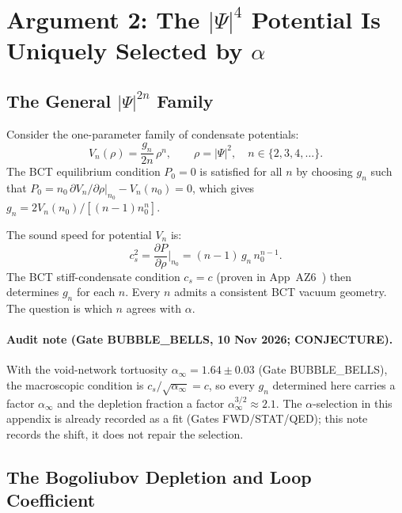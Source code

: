 \documentclass[11pt,a4paper]{article}
\theoremstyle{bctthm}
\theoremstyle{definition}
\begin{document}
\section{Argument 2: The $|\Psi|^4$ Potential Is Uniquely Selected by $\alpha$}

\subsection{The General $|\Psi|^{2n}$ Family}

Consider the one-parameter family of condensate potentials:
\begin{equation}
V_n(\rho) = \frac{g_n}{2n}\,\rho^n, \qquad \rho = |\Psi|^2,\quad n \in \{2,3,4,\ldots\}.
\label{eq:Vn}
\end{equation}
The BCT equilibrium condition $P_0 = 0$ is satisfied for all $n$
by choosing $g_n$ such that $P_0 = n_0\,\partial V_n/\partial\rho|_{n_0} - V_n(n_0) = 0$,
which gives $g_n = 2V_n(n_0)/[(n-1)n_0^n]$.

The sound speed for potential $V_n$ is:
\begin{equation}
c_s^2 = \frac{\partial P}{\partial\rho}\bigg|_{n_0}
= (n-1)\,g_n\,n_0^{n-1}.
\end{equation}
The BCT stiff-condensate condition $c_s = c$ (proven in App~AZ6~\cite{az6})
then determines $g_n$ for each $n$. Every $n$ admits a consistent
BCT vacuum geometry. The question is which $n$ agrees with $\alpha$.

\paragraph*{Audit note (Gate BUBBLE\_BELLS, 10 Nov 2026; CONJECTURE).} With the void-network tortuosity $\alpha_\infty=1.64\pm0.03$ (Gate BUBBLE\_BELLS), the macroscopic condition is $c_s/\sqrt{\alpha_\infty}=c$, so every $g_n$ determined here carries a factor $\alpha_\infty$ and the depletion fraction a factor $\alpha_\infty^{3/2}\approx2.1$. The $\alpha$-selection in this appendix is already recorded as a fit (Gates FWD/STAT/QED); this note records the shift, it does not repair the selection.


\subsection{The Bogoliubov Depletion and Loop Coefficient}
\end{document}
